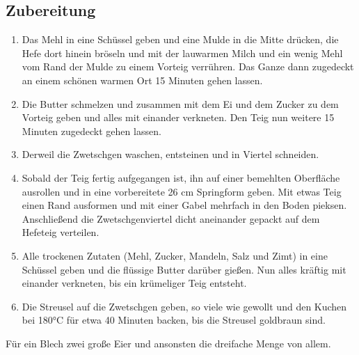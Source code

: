 \subsection*{Zubereitung}

\begin{enumerate}
	\item Das Mehl in eine Schüssel geben und eine Mulde in die Mitte drücken, die Hefe dort hinein bröseln und mit der lauwarmen Milch und ein wenig Mehl vom Rand der Mulde zu einem Vorteig verrühren. Das Ganze dann zugedeckt an einem schönen warmen Ort 15 Minuten gehen lassen.
	\item Die Butter schmelzen und zusammen mit dem Ei und dem Zucker zu dem Vorteig geben und alles mit einander verkneten. Den Teig nun weitere 15 Minuten zugedeckt gehen lassen.
	\item Derweil die Zwetschgen waschen, entsteinen und in Viertel schneiden.
	\item Sobald der Teig fertig aufgegangen ist, ihn auf einer bemehlten Oberfläche ausrollen und in eine vorbereitete 26 cm Springform geben. Mit etwas Teig einen Rand ausformen und mit einer Gabel mehrfach in den Boden pieksen. Anschließend die Zwetschgenviertel dicht aneinander gepackt auf dem Hefeteig verteilen.
	\item Alle trockenen Zutaten (Mehl, Zucker, Mandeln, Salz und Zimt) in eine Schüssel geben und die flüssige Butter darüber gießen. Nun alles kräftig mit einander verkneten, bis ein krümeliger Teig entsteht.
	\item Die Streusel auf die Zwetschgen geben, so viele wie gewollt und den Kuchen bei 180°C für etwa 40 Minuten backen, bis die Streusel goldbraun sind.
\end{enumerate}

Für ein Blech zwei große Eier und ansonsten die dreifache Menge von allem.

